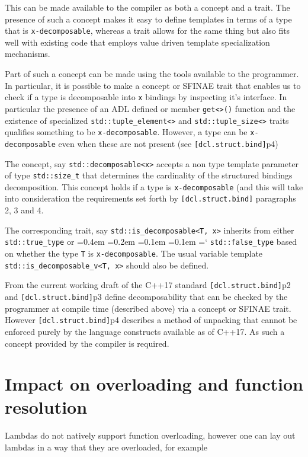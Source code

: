 \documentclass{article}
\newcommand*\justify{%
  \fontdimen2\font=0.4em%
  \fontdimen3\font=0.2em%
  \fontdimen4\font=0.1em%
  \fontdimen7\font=0.1em%
  \hyphenchar\font=`\-%
}
\begin{document}
This can be made available to the compiler as both a concept and a trait.
The presence of such a concept makes it easy to define templates in terms of a
type that is \texttt{x-decomposable}, whereas a trait allows for the same
thing but also fits well with existing code that employs value driven template
specialization mechanisms.

Part of such a concept can be made using the tools available to the
programmer.  In particular, it is possible to make a concept or SFINAE trait
that enables us to check if a type is decomposable into \texttt{x} bindings by
inspecting it's interface.  In particular the presence of an ADL defined or
member \texttt{get<>()} function and the existence of specialized
\texttt{std::tuple\_element<>} and \texttt{std::tuple\_size<>} traits
qualifies something to be \texttt{x-decomposable}.  However, a type can be
\texttt{x-decomposable} even when these are not present (see
\texttt{[dcl.struct.bind]}p4)

The concept, say \texttt{std::decomposable<x>} accepts a non type template
parameter of type \texttt{std::size\_t} that determines the cardinality of the
structured bindings decomposition.  This concept holds if a type is
\texttt{x-decomposable} (and this will take into consideration the
requirements set forth by \texttt{[dcl.struct.bind]} paragraphs 2, 3 and 4.

The corresponding trait, say \texttt{std::is\_decomposable<T, x>} inherits from either \texttt{std::true\_type} or
\justify{\texttt{std::false\_type}} based on whether the type \texttt{T} is
\texttt{x-decomposable}.  The usual variable template
\texttt{std::is\_decomposable\_v<T, x>} should also be defined.

From the current working draft of the C++17 standard
\texttt{[dcl.struct.bind]}p2 and \texttt{[dcl.struct.bind]}p3 define
decomposability that can be checked by the programmer at compile time
(described above) via a concept or SFINAE trait.  However
\texttt{[dcl.struct.bind]}p4 describes a method of unpacking that cannot be
enforced purely by the language constructs available as of C++17.  As such a
concept provided by the compiler is required.


\section{Impact on overloading and function resolution}
Lambdas do not natively support function overloading, however one can lay out
lambdas in a way that they are overloaded, for example
\end{document}
